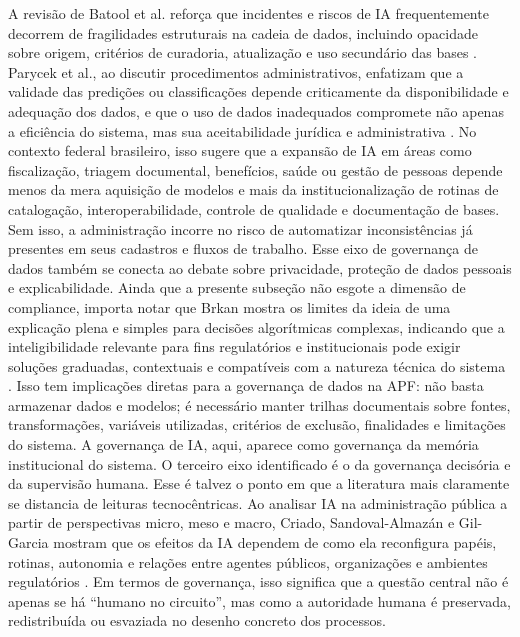 \documentclass[12pt,a4paper]{article}
\begin{document}
A revisão de Batool et al. reforça que incidentes e riscos de IA frequentemente decorrem de fragilidades estruturais na cadeia de dados, incluindo opacidade sobre origem, critérios de curadoria, atualização e uso secundário das bases \autocite{batool2025ai}. Parycek et al., ao discutir procedimentos administrativos, enfatizam que a validade das predições ou classificações depende criticamente da disponibilidade e adequação dos dados, e que o uso de dados inadequados compromete não apenas a eficiência do sistema, mas sua aceitabilidade jurídica e administrativa \autocite{parycek2023artificial}. No contexto federal brasileiro, isso sugere que a expansão de IA em áreas como fiscalização, triagem documental, benefícios, saúde ou gestão de pessoas depende menos da mera aquisição de modelos e mais da institucionalização de rotinas de catalogação, interoperabilidade, controle de qualidade e documentação de bases. Sem isso, a administração incorre no risco de automatizar inconsistências já presentes em seus cadastros e fluxos de trabalho.
Esse eixo de governança de dados também se conecta ao debate sobre privacidade, proteção de dados pessoais e explicabilidade. Ainda que a presente subseção não esgote a dimensão de compliance, importa notar que Brkan mostra os limites da ideia de uma explicação plena e simples para decisões algorítmicas complexas, indicando que a inteligibilidade relevante para fins regulatórios e institucionais pode exigir soluções graduadas, contextuais e compatíveis com a natureza técnica do sistema \autocite{brkan2020legal}. Isso tem implicações diretas para a governança de dados na APF: não basta armazenar dados e modelos; é necessário manter trilhas documentais sobre fontes, transformações, variáveis utilizadas, critérios de exclusão, finalidades e limitações do sistema. A governança de IA, aqui, aparece como governança da memória institucional do sistema.
O terceiro eixo identificado é o da governança decisória e da supervisão humana. Esse é talvez o ponto em que a literatura mais claramente se distancia de leituras tecnocêntricas. Ao analisar IA na administração pública a partir de perspectivas micro, meso e macro, Criado, Sandoval-Almazán e Gil-Garcia mostram que os efeitos da IA dependem de como ela reconfigura papéis, rotinas, autonomia e relações entre agentes públicos, organizações e ambientes regulatórios \autocite{criado2024artificial}. Em termos de governança, isso significa que a questão central não é apenas se há “humano no circuito”, mas como a autoridade humana é preservada, redistribuída ou esvaziada no desenho concreto dos processos.
\end{document}
